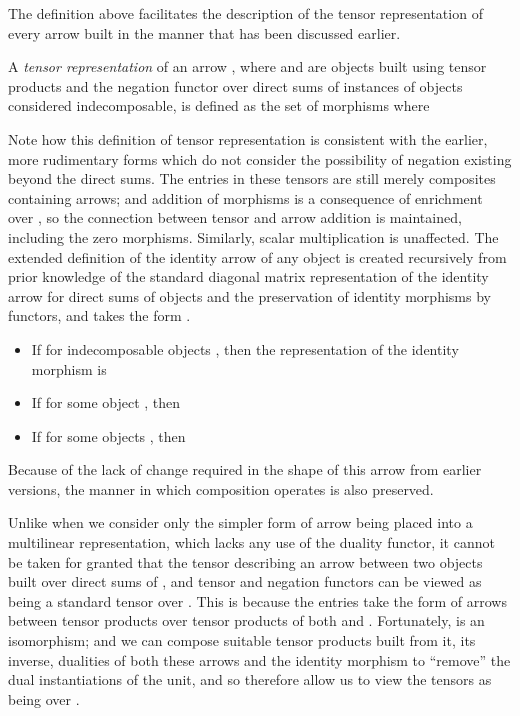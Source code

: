 \documentclass{LMCS}
\theoremstyle{plain}\newtheorem*{cLm}{Claim}
\newcommand{\p}{} \newcommand{\N}{\mathbb{N}}
\newcommand{\hugh}[1]{#1}
\newcommand{\hughg}[1]{#1}
\begin{document}
\noindent The definition above facilitates the description of the tensor representation of every arrow built in the manner that has been discussed earlier.

\begin{defi} \label{TensorRepDefn}
A \emph{tensor representation} of an arrow , where  and  are objects built using tensor products and the negation functor over direct sums of instances of objects considered indecomposable, is defined as the set of morphisms  where
\vspace{-1 mm}
\end{defi}
Note how this definition of tensor representation is consistent with the earlier, more rudimentary forms which do not consider the possibility of negation existing beyond the direct sums. The entries in these tensors are still merely composites containing arrows; and addition of morphisms is a consequence of enrichment over , so the connection between tensor and arrow addition is maintained, including the zero morphisms. Similarly, scalar multiplication is unaffected. The extended definition of the identity arrow of any object  is created recursively from prior knowledge of the standard diagonal matrix representation of the identity arrow for direct sums of objects and the preservation of identity morphisms by functors, and takes the form .

\begin{itemize}
\item If  for indecomposable objects , then the representation of the identity morphism  is

\item If  for some object , then 

\item If  for some objects , then
\medskip
\end{itemize}
Because of the lack of change required in the shape of this arrow from earlier versions, the manner in which composition operates is also preserved.

\p Unlike when we consider only the simpler form of arrow being placed into a multilinear representation, which lacks any use of the duality functor, it cannot be taken for granted that the tensor describing an arrow between two objects built over direct sums of , and tensor and negation functors can be viewed as being a standard tensor over . This is because the entries take the form of arrows between tensor products over tensor products of both  and . \hughg{Fortunately,  is an isomorphism}; and we can compose suitable tensor products built from it, its inverse, dualities of both these arrows and the identity morphism  to ``remove'' the dual instantiations of the unit, and so therefore allow us to view the tensors as being over \hugh{.}
\end{document}
